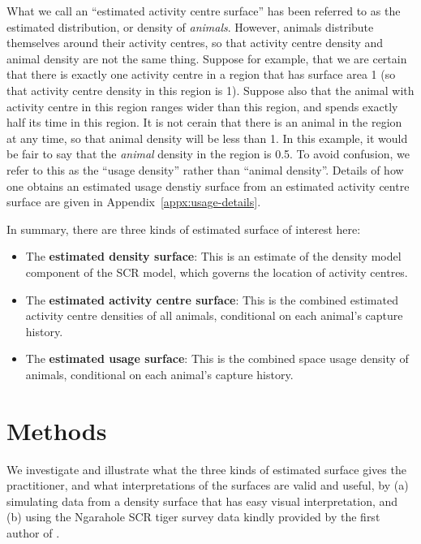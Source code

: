 \documentclass[10pt,a4paper]{article}
\begin{document}
What we call an ``estimated activity centre surface'' has been referred to as the estimated distribution, or density of \textit{animals}. However, animals distribute themselves around their activity centres, so that activity centre density and animal density are not the same thing. Suppose for example, that we are certain that there is exactly one activity centre in a region that has surface area 1 (so that activity centre density in this region is 1). Suppose also that the animal with activity centre in this region ranges wider than this region, and spends exactly half its time in this region. It is not cerain that there is an animal in the region at any time, so that animal density will be less than 1. In this example, it would be fair to say that the \textit{animal} density in the region is 0.5. To avoid confusion, we refer to this as the ``usage density'' rather than ``animal density''. Details of how one obtains an estimated usage denstiy surface from an estimated activity centre surface are given in Appendix~\ref{appx:usage-details}.

In summary, there are three kinds of estimated surface of interest here: 
\begin{itemize}
\item The \textbf{estimated density surface}: This is an estimate of the density model component of the SCR model, which governs the location of activity centres.
\item The \textbf{estimated activity centre surface}: This is the combined estimated activity centre densities of all animals, conditional on each animal's capture history.
\item The \textbf{estimated usage surface}:  This is the combined space usage density of animals, conditional on each animal's capture history.
\end{itemize}



\section{Methods}

We investigate and illustrate what the three kinds of estimated surface gives the practitioner, and what interpretations of the surfaces are valid and useful, by (a) simulating data from a density surface that has easy visual interpretation, and (b) using the Ngarahole SCR tiger survey data kindly provided by the first author of \cite{Dorazio+Karanth:17}.
\end{document}
